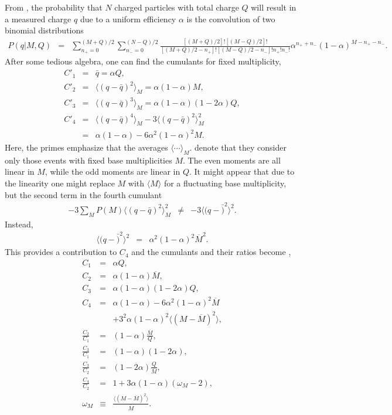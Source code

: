 \documentclass[aps,prc,nofootinbib,showpacs,superscriptaddress,groupedaddress]{revtex4-1}
\begin{document}
From \cite{Savchuk:2019xfg}, the probability that $N$ charged particles with total charge $Q$ will result in a measured charge $q$ due to a uniform efficiency $\alpha$ is the convolution of two binomial distributions
\begin{eqnarray}
P(q|M,Q)&=&\sum_{n_+=0}^{(M+Q)/2}\sum_{n_-=0}^{(N-Q)/2}\frac{[(M+Q)/2]![(M-Q)/2]!}{[(M+Q)/2-n_+]![(M-Q)/2-n_-]!n_+!n_-!}
\alpha^{n_++n_-}(1-\alpha)^{M-n_+-n_-}.
\end{eqnarray}
After some tedious algebra, one can find the cumulants for fixed multiplicity,
\begin{eqnarray}
C'_1&=&\bar{q}=\alpha Q,\\
\nonumber
C'_2&=&\langle (q-\bar{q})^2\rangle_M = \alpha(1-\alpha)M,\\
\nonumber
C'_3&=&\langle (q-\bar{q})^3\rangle_M = \alpha(1-\alpha)(1-2\alpha)Q,\\
\nonumber
C'_4&=&\langle(q-\bar{q})^4\rangle_M -3\langle(q-\bar{q})^2\rangle_M^2\\
\nonumber
&=&\alpha(1-\alpha)-6\alpha^2(1-\alpha)^2M.
\end{eqnarray}
Here, the primes emphasize that the averages $\langle\cdots\rangle_M$. denote that they consider only those events with fixed base multiplicities $M$. The even moments are all linear in $M$, while the odd moments are linear in $Q$. It might appear that due to the linearity one might replace $M$ with $\langle M\rangle$ for a fluctuating base multiplicity, but the second term in the fourth cumulant
\begin{eqnarray}
-3\sum_M P(M) \langle(q-\bar{q})^2\rangle_M^2 &\ne&
-3\langle(q-\bar)^2\rangle^2.
\end{eqnarray}
Instead,
\begin{eqnarray}
\langle(q-\bar)^2\rangle^2&=&\alpha^2(1-\alpha)^2\overline{M}^2.
\end{eqnarray}
This provides a contribution to $C_4$ and the cumulants and their ratios become \cite{Savchuk:2019xfg},
\begin{eqnarray}
\label{eq:savchuck}
C_1&=&\alpha Q,\\
\nonumber
C_2&=&\alpha(1-\alpha)\overline{M},\\
\nonumber
C_3&=&\alpha(1-\alpha)(1-2\alpha)Q,\\
\nonumber
C_4&=&\alpha(1-\alpha)-6\alpha^2(1-\alpha)^2\overline{M}\\
\nonumber
&&+3^2\alpha(1-\alpha)^2\langle(M-\overline{M})^2\rangle,\\
\nonumber
\frac{C_2}{C_1}&=&(1-\alpha)\frac{\overline{M}}{Q},\\
\nonumber
\frac{C_3}{C_1}&=&(1-\alpha)(1-2\alpha),\\
\nonumber
\frac{C_3}{C_2}&=&(1-2\alpha)\frac{Q}{\overline{M}},\\
\nonumber
\frac{C_4}{C_2}&=&1+3\alpha(1-\alpha)(\omega_M-2),\\
\nonumber
\omega_M&\equiv&\frac{\langle(M-\overline{M})^2\rangle}{\overline{M}}.
\end{eqnarray}
\end{document}
